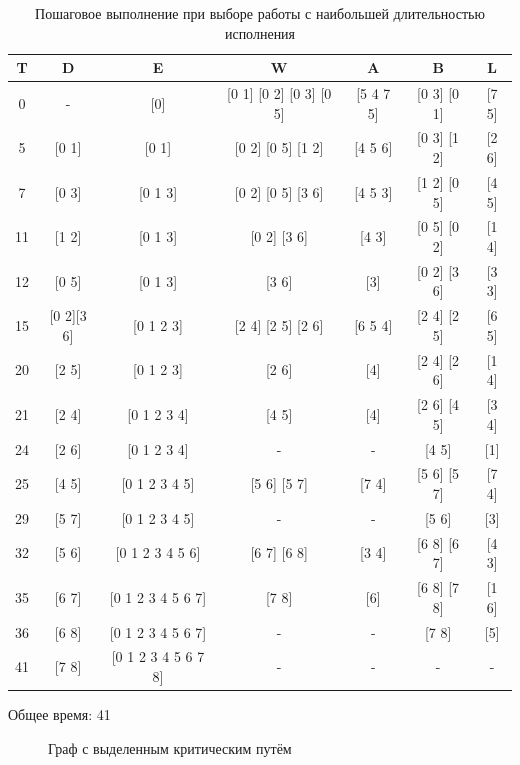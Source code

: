 \documentclass[a4paper,14pt]{extarticle}
\begin{document}
\begin{table}[H]
\caption{Пошаговое выполнение при выборе работы с наибольшей длительностью исполнения}
\label{tabular:timesandtenses}
\begin{center}
\begin{tabular}{|c|c|c|c|c|c|c|}
\hline
T & D & E & W & A & B & L\\ \hline
0 & - & [0] & [0 1] [0 2] [0 3] [0 5] & [5 4 7 5] & [0 3] [0 1] & [7 5]\\ \hline
5 & [0 1] & [0 1] & [0 2] [0 5] [1 2] & [4 5 6] & [0 3] [1 2] & [2 6]\\ \hline
7 & [0 3] & [0 1 3] & [0 2] [0 5] [3 6] & [4 5 3] & [1 2] [0 5] & [4 5]\\ \hline
11 & [1 2] & [0 1 3] & [0 2] [3 6] & [4 3] & [0 5] [0 2] & [1 4]\\ \hline
12 & [0 5] & [0 1 3] & [3 6] & [3] & [0 2] [3 6] & [3 3]\\ \hline
15 & [0 2][3 6] & [0 1 2 3] & [2 4] [2 5] [2 6] & [6 5 4] & [2 4] [2 5] & [6 5]\\ \hline
20 & [2 5] & [0 1 2 3] & [2 6] & [4] & [2 4] [2 6] & [1 4]\\ \hline
21 & [2 4] & [0 1 2 3 4] & [4 5] & [4] & [2 6] [4 5] & [3 4]\\ \hline
24 & [2 6] & [0 1 2 3 4] &  - & - & [4 5] & [1]\\ \hline
25 & [4 5] & [0 1 2 3 4 5] & [5 6] [5 7] & [7 4] & [5 6] [5 7] & [7 4]\\ \hline
29 & [5 7] & [0 1 2 3 4 5] &  - & - & [5 6] & [3]\\ \hline
32 & [5 6] & [0 1 2 3 4 5 6] & [6 7] [6 8] & [3 4] & [6 8] [6 7] & [4 3]\\ \hline
35 & [6 7] & [0 1 2 3 4 5 6 7] & [7 8] & [6] & [6 8] [7 8] & [1 6]\\ \hline
36 & [6 8] & [0 1 2 3 4 5 6 7] &  - & - & [7 8] & [5]\\ \hline
41 & [7 8] & [0 1 2 3 4 5 6 7 8] &  - & - &  - & -\\ \hline
\end{tabular}
\end{center}
\end{table}

Общее время: 41

\begin{figure}[h]
\caption{Граф с выделенным критическим путём}
\label{ris:image}
\end{figure}
\end{document}
